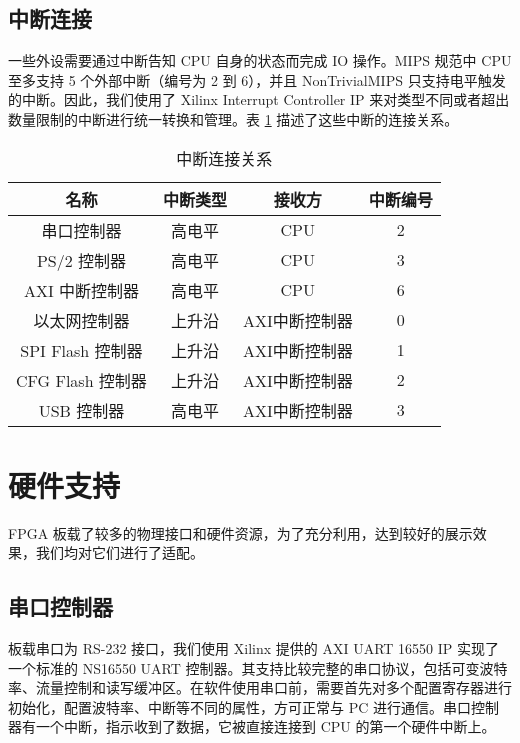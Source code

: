 \subsection{中断连接}

一些外设需要通过中断告知 CPU 自身的状态而完成 IO 操作。MIPS 规范中 CPU 至多支持 5 个外部中断（编号为 2 到 6），并且 NonTrivialMIPS 只支持电平触发的中断。因此，我们使用了 Xilinx Interrupt Controller IP 来对类型不同或者超出数量限制的中断进行统一转换和管理。表 \ref{table:interrupt-connection} 描述了这些中断的连接关系。

\begin{table}[!htbp]
    \centering
    \caption{中断连接关系}
    \label{table:interrupt-connection}
    \begin{tabular}{|c|c|c|c|}
    \hline
    \textbf{名称} &  \textbf{中断类型} & \textbf{接收方} & \textbf{中断编号} \\ \hline
    串口控制器       & 高电平    & CPU     & 2          \\ \hline
    PS/2 控制器       & 高电平    & CPU     & 3          \\ \hline
    AXI 中断控制器       & 高电平    & CPU     & 6          \\ \hline
    以太网控制器       & 上升沿    & AXI中断控制器     & 0          \\ \hline
    SPI Flash 控制器       & 上升沿    & AXI中断控制器     & 1          \\ \hline
    CFG Flash 控制器       & 上升沿    & AXI中断控制器     & 2          \\ \hline
    USB 控制器       & 高电平    & AXI中断控制器     & 3          \\ \hline
    \end{tabular}
\end{table}

\section{硬件支持}

FPGA 板载了较多的物理接口和硬件资源，为了充分利用，达到较好的展示效果，我们均对它们进行了适配。

\subsection{串口控制器}

板载串口为 RS-232 接口，我们使用 Xilinx 提供的 AXI UART 16550 IP 实现了一个标准的 NS16550 UART 控制器。其支持比较完整的串口协议，包括可变波特率、流量控制和读写缓冲区。在软件使用串口前，需要首先对多个配置寄存器进行初始化，配置波特率、中断等不同的属性，方可正常与 PC 进行通信。串口控制器有一个中断，指示收到了数据，它被直接连接到 CPU 的第一个硬件中断上。

